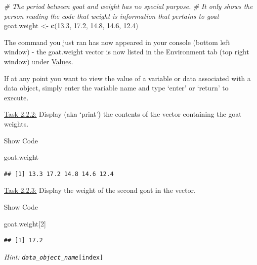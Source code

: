 \documentclass[
]{article}
\newenvironment{Shaded}{\begin{snugshade}}{\end{snugshade}}
\newcommand{\CommentTok}[1]{\textcolor[rgb]{0.56,0.35,0.01}{\textit{#1}}}
\newcommand{\DecValTok}[1]{\textcolor[rgb]{0.00,0.00,0.81}{#1}}
\newcommand{\FloatTok}[1]{\textcolor[rgb]{0.00,0.00,0.81}{#1}}
\newcommand{\FunctionTok}[1]{\textcolor[rgb]{0.13,0.29,0.53}{\textbf{#1}}}
\newcommand{\NormalTok}[1]{#1}
\newcommand{\OtherTok}[1]{\textcolor[rgb]{0.56,0.35,0.01}{#1}}
\begin{document}
\begin{Shaded}
\begin{Highlighting}[]
\CommentTok{\# The period between \textquotesingle{}goat\textquotesingle{} and \textquotesingle{}weight\textquotesingle{} has no special purpose. }
\CommentTok{\# It only shows the person reading the code that \textquotesingle{}weight\textquotesingle{} is information that pertains to \textquotesingle{}goat\textquotesingle{} }
\NormalTok{goat.weight }\OtherTok{\textless{}{-}} \FunctionTok{c}\NormalTok{(}\FloatTok{13.3}\NormalTok{, }\FloatTok{17.2}\NormalTok{, }\FloatTok{14.8}\NormalTok{, }\FloatTok{14.6}\NormalTok{, }\FloatTok{12.4}\NormalTok{)}
\end{Highlighting}
\end{Shaded}

The command you just ran has now appeared in your console (bottom left
window) - the goat.weight vector is now listed in the Environment tab
(top right window) under \ul{Values}.

If at any point you want to view the value of a variable or data
associated with a data object, simply enter the variable name and type
`enter' or `return' to execute.

\ul{Task 2.2.2:} Display (aka `print') the contents of the vector
containing the goat weights.

Show Code

\begin{Shaded}
\begin{Highlighting}[]
\NormalTok{goat.weight}
\end{Highlighting}
\end{Shaded}

\begin{verbatim}
## [1] 13.3 17.2 14.8 14.6 12.4
\end{verbatim}

\ul{Task 2.2.3:} Display the weight of the second goat in the vector.

Show Code

\begin{Shaded}
\begin{Highlighting}[]
\NormalTok{goat.weight[}\DecValTok{2}\NormalTok{]}
\end{Highlighting}
\end{Shaded}

\begin{verbatim}
## [1] 17.2
\end{verbatim}

\emph{Hint:} \emph{\texttt{data\_object\_name}}\texttt{{[}index{]}}
\end{document}
